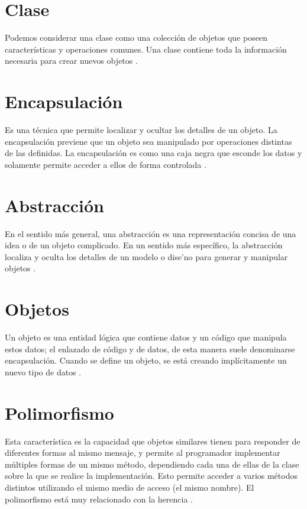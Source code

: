\section{Clase}
Podemos considerar una clase como una colección de objetos que poseen características y operaciones comunes. Una clase contiene toda la información necesaria para crear nuevos objetos \citep{izquierdo2007introduccion}.

\section{Encapsulación}
Es una técnica que permite localizar y ocultar los detalles de un objeto. La encapsulación previene que un objeto sea manipulado por operaciones distintas de las definidas. La encapsulación es como una caja negra que esconde los datos y solamente permite acceder a ellos de forma controlada \citep{izquierdo2007introduccion}.

\section{Abstracción}
En el sentido más general, una abstracción es una representación concisa de una idea o de un objeto complicado. En un sentido más específico, la abstracción localiza y oculta los detalles de un modelo o dise'no para generar y manipular objetos \citep{izquierdo2007introduccion}. 

\section{Objetos}
Un objeto es una entidad lógica que contiene datos y un código que manipula estos datos; el enlazado de código y de datos, de esta manera suele denominarse encapsulación. Cuando se define un objeto, se está creando implícitamente un nuevo tipo de datos \citep{izquierdo2007introduccion}.

\section{Polimorfismo}
Esta característica es la capacidad que objetos similares tienen para responder de
diferentes formas al mismo mensaje, y permite al programador implementar
múltiples formas de un mismo método, dependiendo cada una de ellas de la clase
sobre la que se realice la implementación. Esto permite acceder a varios métodos
distintos utilizando el mismo medio de acceso (el mismo nombre). El polimorfismo
está muy relacionado con la herencia \citep{velarde2006introduccion}.

